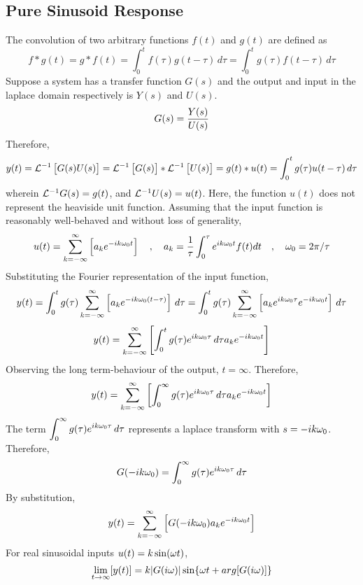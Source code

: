 \documentclass[class=report, 12pt, crop=false]{standalone}
\begin{document}
\begin{center}
\section{Pure Sinusoid Response}
\begin{comment}
\end{comment}
The convolution of two arbitrary functions $f(t)$ and $g(t)$ are defined as
$$f*g(t) = g*f(t) = \int^{t}_{0}f(\tau)g(t - \tau)\,d\tau = \int^{t}_{0}g(\tau)f(t - \tau)\,d\tau$$
Suppose a system has a transfer function $G(s)$ and the output and input in the laplace domain respectively is $Y(s)$ and $U(s)$.
$$G(s) = \frac{Y(s)}{U(s)}$$
Therefore,
$$y(t) = \mathcal{L}^{-1}\left[G(s)U(s)\right] = \mathcal{L}^{-1}\left[ G(s)\right]*\mathcal{L}^{-1}\left[ U(s)\right] = g(t)*u(t) = \int^{t}_{0}g(\tau)u(t - \tau)\,d\tau$$
wherein $\mathcal{L}^{-1}G(s) = g(t)$, and $\mathcal{L}^{-1}U(s) = u(t)$. Here, the function $u(t)$ does not represent the heaviside unit function. Assuming that the input function is reasonably well-behaved and without loss of generality, 
$$u(t) = \sum^{\infty}_{k = -\infty}\left[a_ke^{-ik\omega_0t}\right]\quad,\quad a_k = \frac{1}{\tau}\int^{\tau}_{0}e^{ik\omega_0t}f(t)dt\quad,\quad \omega_0 = 2\pi/\tau$$
Substituting the Fourier representation of the input function,
$$y(t) = \int^{t}_{0}g(\tau)\sum^{\infty}_{k = -\infty}\left[a_ke^{-ik\omega_0(t-\tau)}\right]\,d\tau = \int^{t}_{0}g(\tau)\sum^{\infty}_{k = -\infty}\left[a_ke^{ik\omega_0\tau}e^{-ik\omega_0t}\right]\,d\tau$$
$$y(t) = \sum^{\infty}_{k = -\infty}\left[\int^{t}_{0}g(\tau)e^{ik\omega_0\tau}\,d\tau a_ke^{-ik\omega_0t}\right]$$
Observing the long term-behaviour of the output, $t = \infty$. Therefore,
$$y(t) = \sum^{\infty}_{k = -\infty}\left[\int^{\infty}_{0}g(\tau)e^{ik\omega_0\tau}\,d\tau a_ke^{-ik\omega_0t}\right]$$
The term $\displaystyle{\int^{\infty}_{0}g(\tau)e^{ik\omega_0\tau}\,d\tau}$ represents a laplace transform with $s = -ik\omega_0$. Therefore, 
$$G(-ik\omega_0) = \int^{\infty}_{0}g(\tau)e^{ik\omega_0\tau}\,d\tau$$
By substitution,
$$y(t) = \sum^{\infty}_{k = -\infty}\left[G(-ik\omega_0) a_ke^{-ik\omega_0t}\right]$$
For real sinusoidal inputs $\displaystyle{u(t) = k\sin(\omega t)}$,
$$\lim_{t\to\infty}[y(t)] = k|G(i\omega)|\sin\{\omega t + arg[G(i\omega)]\}$$
\end{center}
\end{document}
